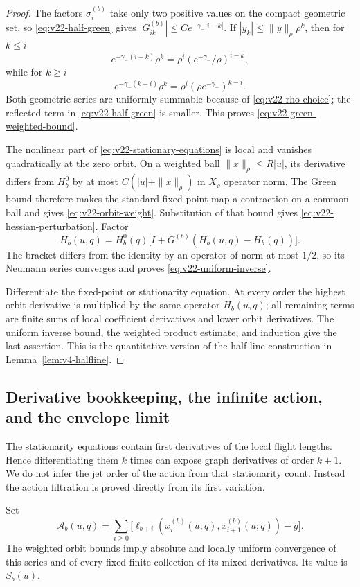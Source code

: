 \begin{proof}
The factors $\sigma_i^{(b)}$ take only two positive values on the compact
geometric set, so \eqref{eq:v22-half-green} gives
$|G^{(b)}_{ik}|\le C e^{-\gamma_-|i-k|}$.  If
$|y_k|\le\|y\|_\rho\rho^k$, then for $k\le i$
\[
 e^{-\gamma_-(i-k)}\rho^k
 =\rho^i(e^{-\gamma_-}/\rho)^{i-k},
\]
while for $k\ge i$
\[
 e^{-\gamma_-(k-i)}\rho^k
 =\rho^i(\rho e^{-\gamma_-})^{k-i}.
\]
Both geometric series are uniformly summable because of
\eqref{eq:v22-rho-choice}; the reflected term in
\eqref{eq:v22-half-green} is smaller.  This proves
\eqref{eq:v22-green-weighted-bound}.

The nonlinear part of \eqref{eq:v22-stationary-equations} is local and
vanishes quadratically at the zero orbit.  On a weighted ball
$\|x\|_\rho\le R|u|$, its derivative differs from $H_b^0$ by at most
$C(|u|+\|x\|_\rho)$ in $X_\rho$ operator norm.  The Green bound therefore
makes the standard fixed-point map a contraction on a common ball and gives
\eqref{eq:v22-orbit-weight}.  Substitution of that bound gives
\eqref{eq:v22-hessian-perturbation}.  Factor
\[
 H_b(u,q)=H_b^0(q)\bigl[I+G^{(b)}(H_b(u,q)-H_b^0(q))\bigr].
\]
The bracket differs from the identity by an operator of norm at most $1/2$,
so its Neumann series converges and proves \eqref{eq:v22-uniform-inverse}.

Differentiate the fixed-point or stationarity equation.  At every order the
highest orbit derivative is multiplied by the same operator $H_b(u,q)$;
all remaining terms are finite sums of local coefficient derivatives and
lower orbit derivatives.  The uniform inverse bound, the weighted product
estimate, and induction give the last assertion.  This is the quantitative
version of the half-line construction in Lemma~\ref{lem:v4-halfline}.
\end{proof}

\subsection{Derivative bookkeeping, the infinite action, and the envelope limit}

The stationarity equations contain first derivatives of the local flight
lengths.  Hence differentiating them $k$ times can expose graph derivatives
of order $k+1$.  We do not infer the jet order of the action from that
stationarity count.  Instead the action filtration is proved directly from
its first variation.

Set
\begin{equation}\label{eq:v22-infinite-action}
 \mathscr A_b(u,q)=\sum_{i\ge0}
 \bigl[\ell_{b+i}(x_i^{(b)}(u;q),x_{i+1}^{(b)}(u;q))-g\bigr].
\end{equation}
The weighted orbit bounds imply absolute and locally uniform convergence of
this series and of every fixed finite collection of its mixed derivatives.
Its value is $S_b(u)$.

